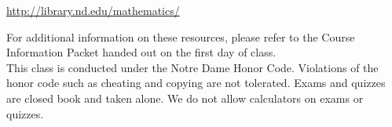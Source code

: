 \documentclass{article}[12pt]
\begin{document}
\centerline{\url{http://library.nd.edu/mathematics/}}
\noindent For additional information on these resources, please refer to
the Course Information Packet handed out on the first day of class. \\

 This class is conducted under the Notre
Dame Honor Code. Violations of the honor code such as cheating and copying
are not tolerated. Exams and quizzes are closed book and taken alone. We do
not allow calculators on exams or quizzes.
\end{document}

